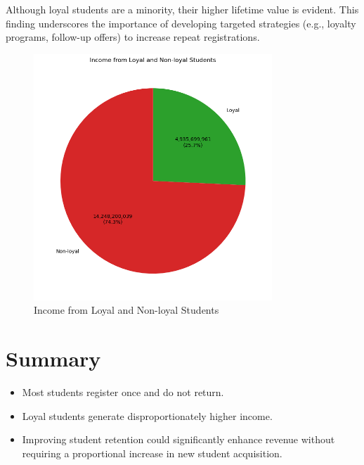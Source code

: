 \documentclass[12pt,a4paper]{article}
\begin{document}
Although loyal students are a minority, their higher lifetime value is evident. This finding underscores the importance of developing targeted strategies (e.g., loyalty programs, follow-up offers) to increase repeat registrations.

\begin{figure}[h!]
    \centering
    \includegraphics[width=0.8\textwidth]{Income from Loyal and Non-loyal Students (Pie Chart).png}
    \caption{Income from Loyal and Non-loyal Students}
    \label{fig:loyalty-income}
\end{figure}

\section*{Summary}
\begin{itemize}
    \item Most students register once and do not return.
    \item Loyal students generate disproportionately higher income.
    \item Improving student retention could significantly enhance revenue without requiring a proportional increase in new student acquisition.
\end{itemize}
\end{document}
